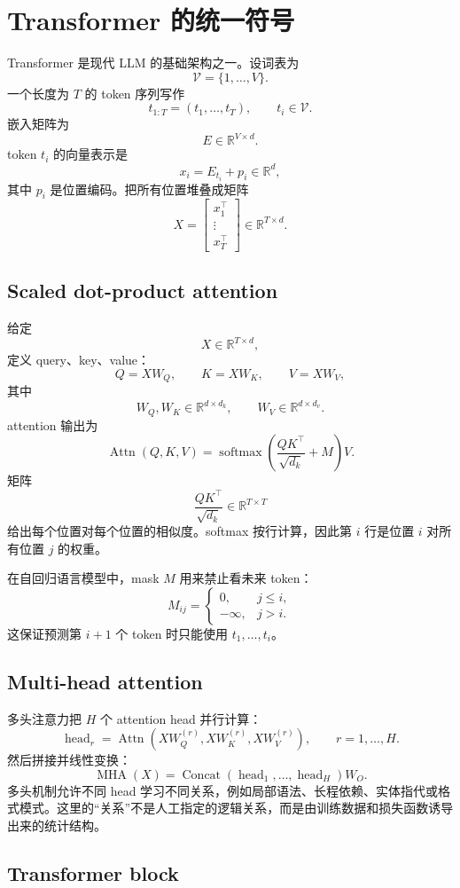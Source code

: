 \documentclass[UTF8,11pt,fontset=none]{ctexart}
\newcommand{\R}{\mathbb{R}}
\newcommand{\Vocab}{\mathcal V}
\newcommand{\softmax}{\operatorname{softmax}}
\newcommand{\Attn}{\operatorname{Attn}}
\newcommand{\MHAttn}{\operatorname{MHA}}
\begin{document}
\section{Transformer 的统一符号}

Transformer 是现代 LLM 的基础架构之一。设词表为
\[
\Vocab=\{1,\ldots,V\}.
\]
一个长度为 \(T\) 的 token 序列写作
\[
t_{1:T}=(t_1,\ldots,t_T),\qquad t_i\in\Vocab.
\]
嵌入矩阵为
\[
E\in\R^{V\times d}.
\]
token \(t_i\) 的向量表示是
\[
x_i=E_{t_i}+p_i\in\R^d,
\]
其中 \(p_i\) 是位置编码。把所有位置堆叠成矩阵
\[
X=
\begin{bmatrix}
x_1^\top\\
\vdots\\
x_T^\top
\end{bmatrix}
\in\R^{T\times d}.
\]

\subsection{Scaled dot-product attention}

给定
\[
X\in\R^{T\times d},
\]
定义 query、key、value：
\[
Q=XW_Q,\qquad K=XW_K,\qquad V=XW_V,
\]
其中
\[
W_Q,W_K\in\R^{d\times d_k},
\qquad
W_V\in\R^{d\times d_v}.
\]
attention 输出为
\[
\Attn(Q,K,V)
=
\softmax\!\left(\frac{QK^\top}{\sqrt{d_k}}+M\right)V.
\]
矩阵
\[
\frac{QK^\top}{\sqrt{d_k}}\in\R^{T\times T}
\]
给出每个位置对每个位置的相似度。softmax 按行计算，因此第 \(i\) 行是位置 \(i\) 对所有位置 \(j\) 的权重。

在自回归语言模型中，mask \(M\) 用来禁止看未来 token：
\[
M_{ij}=
\begin{cases}
0,& j\le i,\\
-\infty,& j>i.
\end{cases}
\]
这保证预测第 \(i+1\) 个 token 时只能使用 \(t_1,\ldots,t_i\)。

\subsection{Multi-head attention}

多头注意力把 \(H\) 个 attention head 并行计算：
\[
\operatorname{head}_r
=
\Attn(XW_Q^{(r)},XW_K^{(r)},XW_V^{(r)}),
\qquad r=1,\ldots,H.
\]
然后拼接并线性变换：
\[
\MHAttn(X)=
\operatorname{Concat}(\operatorname{head}_1,\ldots,\operatorname{head}_H)W_O.
\]
多头机制允许不同 head 学习不同关系，例如局部语法、长程依赖、实体指代或格式模式。这里的“关系”不是人工指定的逻辑关系，而是由训练数据和损失函数诱导出来的统计结构。

\subsection{Transformer block}
\end{document}
